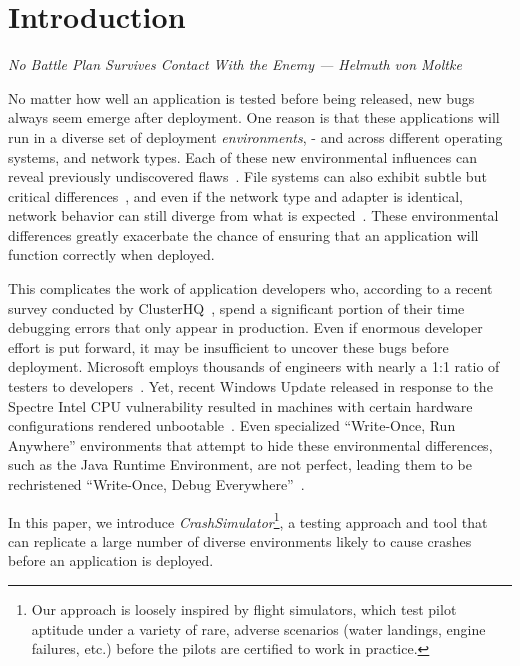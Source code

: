 \section{Introduction}
\label{SEC:introduction}
\textit{No Battle Plan Survives Contact With the Enemy --- Helmuth von Moltke}

No matter how well an application is tested before being released, new bugs
always seem emerge after deployment.  One reason
is that these applications will run in a diverse set of
deployment \emph{environments}, - and
across different operating systems, and network types.
Each of these new environmental influences can reveal previously
undiscovered flaws~\cite{LinuxGlibcChanges}.
File
systems can also exhibit subtle but critical
differences~\cite{EXT4Layout, AppleHFS}, and even if the network type and
adapter is identical, network
behavior can still diverge from what is expected~\cite{vbox}.
These environmental differences greatly
exacerbate the chance of ensuring that an application will function
correctly when deployed.

This complicates the work of application developers who, according to a
recent survey conducted by ClusterHQ~\cite{ClusterHQSurvey},
spend a significant portion of their time
debugging errors that only appear in production.
Even if
enormous developer effort is put forward, it may be insufficient
to uncover these bugs
before deployment.  Microsoft employs thousands of engineers with nearly a
1:1 ratio of testers to developers~\cite{Page2009}.
Yet, recent Windows Update released in response
to the Spectre Intel CPU vulnerability resulted in machines with certain
hardware configurations rendered unbootable~\cite{kb4056892}.  Even
specialized ``Write-Once, Run Anywhere'' environments that attempt to hide
these environmental differences, such as the Java Runtime Environment, are
not perfect, leading them to be rechristened ``Write-Once, Debug
Everywhere''~\cite{WODE}.


In this paper, we introduce {\em CrashSimulator}\footnote{ Our approach is
loosely inspired by flight simulators, which test pilot aptitude under a
variety of rare, adverse scenarios (water landings, engine failures, etc.)
before the pilots are certified to work in practice.}, a testing approach
and tool that can replicate a large
number of diverse environments likely to cause crashes before an
application is deployed.

